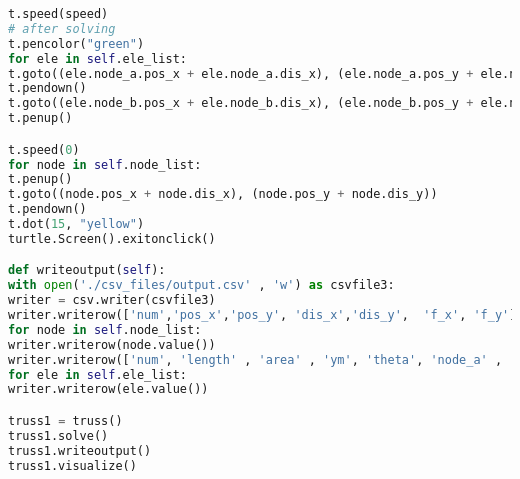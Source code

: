 \begin{lstlisting}[language=Python , basicstyle=\linespread{0.75}\listingsfont]
t.speed(speed)
# after solving
t.pencolor("green")
for ele in self.ele_list:
t.goto((ele.node_a.pos_x + ele.node_a.dis_x), (ele.node_a.pos_y + ele.node_a.dis_y))
t.pendown()
t.goto((ele.node_b.pos_x + ele.node_b.dis_x), (ele.node_b.pos_y + ele.node_b.dis_y))
t.penup()

t.speed(0)
for node in self.node_list:
t.penup()
t.goto((node.pos_x + node.dis_x), (node.pos_y + node.dis_y))
t.pendown()
t.dot(15, "yellow")
turtle.Screen().exitonclick()

def writeoutput(self):
with open('./csv_files/output.csv' , 'w') as csvfile3:
writer = csv.writer(csvfile3)
writer.writerow(['num','pos_x','pos_y', 'dis_x','dis_y',  'f_x', 'f_y'])
for node in self.node_list:
writer.writerow(node.value())
writer.writerow(['num', 'length' , 'area' , 'ym', 'theta', 'node_a' , 'node_b'])
for ele in self.ele_list:
writer.writerow(ele.value())

truss1 = truss()
truss1.solve()
truss1.writeoutput()
truss1.visualize()
\end{lstlisting}